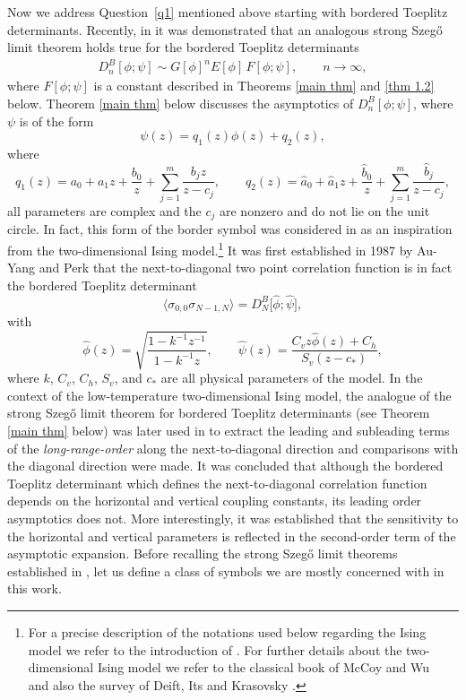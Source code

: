 \documentclass[10pt,a4paper]{amsart}
\numberwithin{equation}{section}
\begin{document}
Now we address Question~\ref{q1} mentioned above starting with bordered Toeplitz determinants. Recently, in \cite{BEGIL} it was demonstrated that an analogous strong Szeg\H{o} limit theorem holds true for the bordered Toeplitz determinants
\begin{gather*}%
	D^{B}_{n}[\phi; \psi] \sim G[\phi]^{n} E[\phi]\,F[\phi; \psi], \qquad n\to\infty,
\end{gather*}
where $F[\phi; \psi]$ is a constant described in Theorems \ref{main thm} and \ref{thm 1.2} below. Theorem \ref{main thm} below discusses the asymptotics of $D^{B}_{n}[\phi; \psi]$, where $\psi$ is of the form
\begin{equation}\label{general psi}
	\psi(z) = q_1(z) \phi(z) + q_2(z),
\end{equation}where
\begin{equation}\label{q1 q2}
	q_1(z) = a_0+a_1z+\frac{b_0}{z}+\sum^{m}_{j=1}\frac{b_j z}{z-c_j},\qquad q_2(z) = \hat{a}_0+\hat{a}_1z+\frac{\hat{b}_0}{z}+
	\sum_{j=1}^m \frac{\hat{b}_j}{z-c_j},
\end{equation}
all parameters are complex and the $c_j$ are nonzero and do not lie on the unit circle. In fact, this form of the border symbol was considered in \cite{BEGIL} as an inspiration from the two-dimensional Ising model.\footnote{For a precise description of the notations used below regarding the Ising model we refer to the introduction of \cite{BEGIL}. For further details about the two-dimensional Ising model we refer to the classical book of McCoy and Wu~\cite{McCoy-Wu} and also the survey of Deift, Its and Krasovsky \cite{DIK1}.} It was first established in 1987 by Au-Yang and Perk \cite{YP} that the next-to-diagonal two point correlation function is in fact the bordered Toeplitz determinant
\[%
	\langle \sigma_{0,0}\sigma_{N-1,N} \rangle = D^B_N\big[\widehat{\phi}; \widehat{\psi}\big],
\]
with
\begin{equation}\label{hat psi}
	\widehat{\phi}(z) = \sqrt{\frac{1-k^{-1}z^{-1}}{1-k^{-1}z}},\qquad	\widehat{\psi}(z)= \frac{C_v z\widehat{\phi}(z)+C_h}{S_v(z-c_*)},
\end{equation} where $k$, $C_v$, $C_h$, $S_v$, and $c_*$ are all physical parameters of the model. In the context of the low-temperature two-dimensional Ising model, the analogue of the strong Szeg\H{o} limit theorem for bordered Toeplitz determinants (see Theorem \ref{main thm} below) was later used in \cite{BEGIL} to extract the leading and subleading terms of the \textit{long-range-order} along the next-to-diagonal direction and comparisons with the diagonal direction were made. It was concluded that although the bordered Toeplitz determinant which defines the next-to-diagonal correlation function depends on the horizontal and vertical coupling constants, its leading order asymptotics
does not. More interestingly, it was established that the sensitivity to the horizontal and vertical parameters is reflected in the second-order term of the asymptotic expansion. Before recalling the strong Szeg\H{o} limit theorems established in \cite{BEGIL}, let us define a class of symbols we are mostly concerned with in this work.
\end{document}
